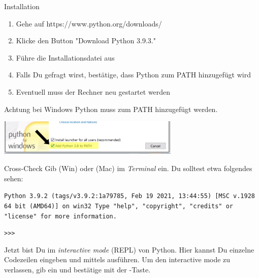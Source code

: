 \begin{frame}
\begin{block}{Installation}
\begin{enumerate}
	\item Gehe auf https://www.python.org/downloads/
	\item Klicke den Button "Download Python 3.9.3."
	\item Führe die Installationsdatei aus
	\item Falls Du gefragt wirst, bestätige, dass Python zum PATH hinzugefügt wird
	\item Eventuell muss der Rechner neu gestartet werden
\end{enumerate}	
\end{block}

\begin{alertblock}{Achtung bei Windows}
\vspace{2pt}
Python muss zum PATH hinzugefügt werden. 

\includegraphics[width=0.65\textwidth]{python_path.jpg}
\end{alertblock}

\end{frame}

\begin{frame}
\begin{block}{Cross-Check}
\vspace{2pt}
Gib  (Win) oder  (Mac) im \textit{Terminal} ein.
Du solltest etwa folgendes sehen:  
\vspace{12pt}

\texttt{Python 3.9.2 (tags/v3.9.2:1a79785, Feb 19 2021, 13:44:55) [MSC v.1928 64 bit (AMD64)] on win32
	Type "help", "copyright", "credits"{} or "license"{} for more information.}

\texttt{>{}>{}>}
\end{block}
\begin{block}{}
Jetzt bist Du im \textit{interactive mode} (REPL) von Python. Hier kannst Du einzelne Codezeilen eingeben und mittels  ausführen. 
Um den interactive mode zu verlassen, gib  ein und bestätige mit der -Taste. 	
\end{block}
\end{frame}


